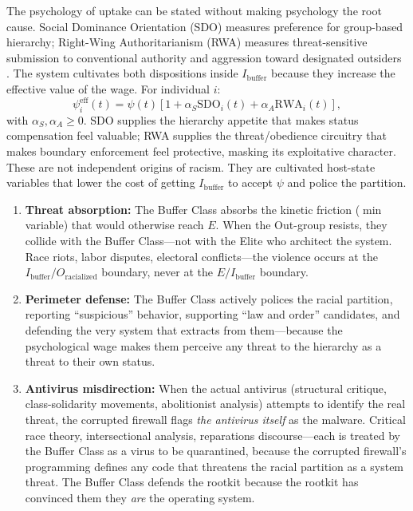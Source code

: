 The psychology of uptake can be stated without making psychology the root cause. Social Dominance Orientation (SDO) measures preference for group-based hierarchy; Right-Wing Authoritarianism (RWA) measures threat-sensitive submission to conventional authority and aggression toward designated outsiders \cite{pratto_sdo_1994,altemeyer_authoritarian_1998,duckitt_dual_process_2001}. The system cultivates both dispositions inside $I_{\text{buffer}}$ because they increase the effective value of the wage. For individual $i$:
\[
\psi_i^{\mathrm{eff}}(t) = \psi(t)\left[1 + \alpha_S \mathrm{SDO}_i(t) + \alpha_A \mathrm{RWA}_i(t)\right],
\]
with $\alpha_S,\alpha_A \ge 0$. SDO supplies the hierarchy appetite that makes status compensation feel valuable; RWA supplies the threat/obedience circuitry that makes boundary enforcement feel protective, masking its exploitative character. These are not independent origins of racism. They are cultivated host-state variables that lower the cost of getting $I_{\text{buffer}}$ to accept $\psi$ and police the partition.

\begin{enumerate}
    \item \textbf{Threat absorption:} The Buffer Class absorbs the kinetic friction ($\min$ variable) that would otherwise reach $E$. When the Out-group resists, they collide with the Buffer Class---not with the Elite who architect the system. Race riots, labor disputes, electoral conflicts---the violence occurs at the $I_{\text{buffer}} / O_{\text{racialized}}$ boundary, never at the $E / I_{\text{buffer}}$ boundary.

    \item \textbf{Perimeter defense:} The Buffer Class actively polices the racial partition, reporting ``suspicious'' behavior, supporting ``law and order'' candidates, and defending the very system that extracts from them---because the psychological wage makes them perceive any threat to the hierarchy as a threat to their own status.

    \item \textbf{Antivirus misdirection:} When the actual antivirus (structural critique, class-solidarity movements, abolitionist analysis) attempts to identify the real threat, the corrupted firewall flags \textit{the antivirus itself} as the malware. Critical race theory, intersectional analysis, reparations discourse---each is treated by the Buffer Class as a virus to be quarantined, because the corrupted firewall's programming defines any code that threatens the racial partition as a system threat. The Buffer Class defends the rootkit because the rootkit has convinced them they \textit{are} the operating system.
\end{enumerate}

